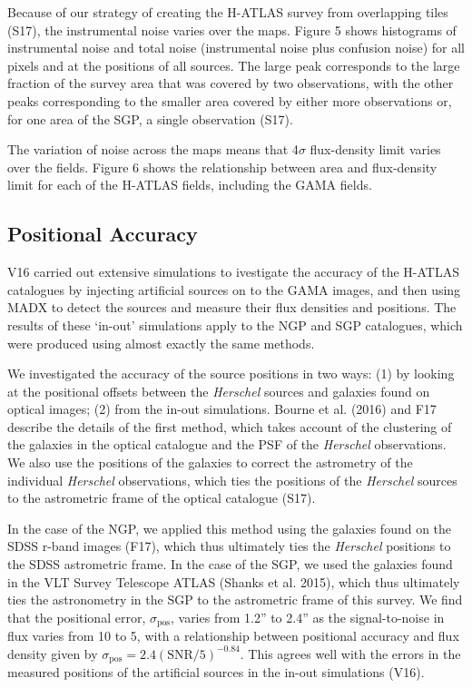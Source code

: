 \documentclass[useAMS,usenatbib]{mn2e}
\begin{document}
Because of our strategy of creating the H-ATLAS survey
from overlapping tiles (S17),
the instrumental noise varies over the maps.
Figure 5 shows histograms of instrumental noise and total noise
(instrumental noise plus confusion noise) for all pixels
and at the positions of all sources.
The large peak corresponds to the large fraction of the
survey area that was covered by two observations, with the
other peaks corresponding to the smaller area covered by
either more observations or, for one area of the SGP, a single
observation (S17).

The variation of noise across the maps means that 
4$\sigma$ flux-density limit varies over the fields.
Figure 6 shows the relationship between 
area and flux-density limit
for each of the H-ATLAS fields, including the GAMA fields.

\subsection{Positional Accuracy}

V16 carried out extensive simulations to ivestigate the
accuracy of the H-ATLAS catalogues by injecting
artificial sources on to the GAMA images, and then using MADX to detect the
sources and measure their flux densities and positions. The results
of these `in-out' simulations apply to the NGP and SGP catalogues, which were
produced using almost exactly the same methods.

We investigated the accuracy of the source positions
in two ways: (1) by looking at the positional offsets
between the {\it Herschel} sources and galaxies found
on optical images; (2) from the in-out simulations.
Bourne et al. (2016) and F17 describe the details of the first method,
which takes account of the clustering of the galaxies in the optical
catalogue and the PSF of the {\it Herschel} observations.
We also use the positions of the galaxies to correct the
astrometry of the individual {\it Herschel} observations, which
ties the positions of the {\it Herschel} sources
to the astrometric frame of the optical catalogue (S17).

In the case of the NGP, we applied this method using
the galaxies found on the SDSS r-band images (F17), which
thus ultimately ties the {\it Herschel} positions to
the SDSS astrometric frame.
In the case of the SGP, we used the galaxies
found in the VLT Survey Telescope ATLAS (Shanks et al.
2015), which thus ultimately ties the astronometry in the
SGP to the astrometric frame of this survey.
We find that the positional error,
$\sigma_\mathrm{pos}$, varies from 1.2'' to 2.4'' as the
signal-to-noise in flux varies from 10 to 5, 
with a relationship between positional accuracy and flux density
given by
$\sigma_\mathrm{pos} =
2.4 (\mathrm{SNR}/5)^{-0.84}$.
This agrees well with the errors in the measured
positions of the
artificial sources in the in-out simulations (V16).
\end{document}
